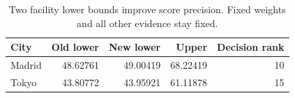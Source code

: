 \newcommand{\WidthBefore}{16.18302}
\newcommand{\WidthAfter}{16.15002}
\newcommand{\WidthReduction}{0.204}
\begin{table}[htbp]\centering
\caption{Two facility lower bounds improve score precision. Fixed weights and all other evidence stay fixed.}
\begin{tabular}{lrrrr}\toprule
City & Old lower & New lower & Upper & Decision rank\\\midrule
Madrid & 48.62761 & 49.00419 & 68.22419 & 10 \\
Tokyo & 43.80772 & 43.95921 & 61.11878 & 15 \\
\bottomrule\end{tabular}\end{table}
